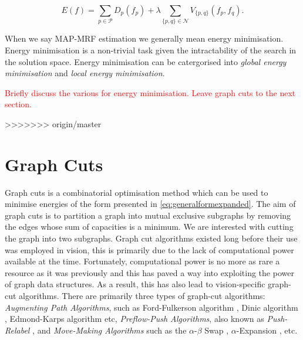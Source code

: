 \begin{equation}
	E(f) = \sum_{p \in \mathcal{P}}D_p(f_p) + \lambda \sum_{\{p,q\} \in \mathcal{N}}V_{\{p,q\}}(f_p,f_q).
		\label{eq:generalformexpanded}
\end{equation}
 
 When we say MAP-MRF estimation we generally mean energy minimisation. Energy minimisation is a non-trivial task given the intractability of the search in the solution space. Energy minimisation can be catergorised into \textit{global energy minimisation} and \textit{local energy minimisation}.
 
 \textcolor{red}{Briefly discuss the various for energy minimisation. Leave graph cuts to the next section.}
 
>>>>>>> origin/master

\section{Graph Cuts}
\label{sec:GraphCuts}

Graph cuts is a combinatorial optimisation method which can be used to minimise energies of the form presented in \autoref{eq:generalformexpanded}. The aim of graph cuts is to partition a graph into mutual exclusive subgraphs by removing the edges whose sum of capacities is a minimum. We are interested with cutting the graph into two subgraphs. Graph cut algorithms existed long before their use was employed in vision, this is primarily due to the lack of computational power available at the time. Fortunately, computational power is no more as rare a resource as it was previously and this has paved a way into exploiting the power of graph data structures. As a result, this has also lead to vision-specific graph-cut algorithms. There are primarily three types of graph-cut algorithms: \textit{Augmenting Path Algorithms}, such as Ford-Fulkerson algorithm \citep{Ford1956}, Dinic algorithm \citep{Dinic1970}, Edmond-Karps algorithm \citep{Edmonds1972} etc, \textit{Preflow-Push Algorithms}, also known as \textit{Push-Relabel} \citep{Goldberg1988}, and \textit{Move-Making Algorithms} such as the $\alpha$-$\beta$ Swap \citep{Boykov2001}, $\alpha$-Expansion \citep{Boykov2001}, etc.


